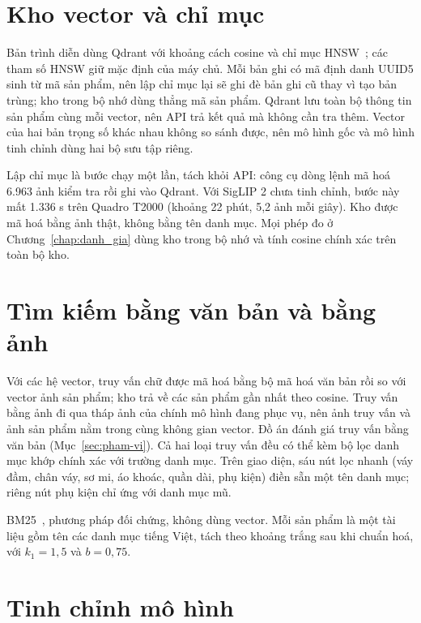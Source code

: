 \section{Kho vector và chỉ mục}
\label{sec:kho-vector}

Bản trình diễn dùng Qdrant với khoảng cách cosine và chỉ mục HNSW~\cite{malkov2020hnsw}; các tham số HNSW giữ mặc định của máy chủ. Mỗi bản ghi có mã định danh UUID5 sinh từ mã sản phẩm, nên lập chỉ mục lại sẽ ghi đè bản ghi cũ thay vì tạo bản trùng; kho trong bộ nhớ dùng thẳng mã sản phẩm. Qdrant lưu toàn bộ thông tin sản phẩm cùng mỗi vector, nên API trả kết quả mà không cần tra thêm. Vector của hai bản trọng số khác nhau không so sánh được, nên mô hình gốc và mô hình tinh chỉnh dùng hai bộ sưu tập riêng.

Lập chỉ mục là bước chạy một lần, tách khỏi API: công cụ dòng lệnh mã hoá 6.963 ảnh kiểm tra rồi ghi vào Qdrant. Với SigLIP 2 chưa tinh chỉnh, bước này mất 1.336 s trên Quadro T2000 (khoảng 22 phút, 5,2 ảnh mỗi giây). Kho được mã hoá bằng ảnh thật, không bằng tên danh mục. Mọi phép đo ở Chương~\ref{chap:danh_gia} dùng kho trong bộ nhớ và tính cosine chính xác trên toàn bộ kho.

\section{Tìm kiếm bằng văn bản và bằng ảnh}
\label{sec:tim-kiem}

Với các hệ vector, truy vấn chữ được mã hoá bằng bộ mã hoá văn bản rồi so với vector ảnh sản phẩm; kho trả về các sản phẩm gần nhất theo cosine. Truy vấn bằng ảnh đi qua tháp ảnh của chính mô hình đang phục vụ, nên ảnh truy vấn và ảnh sản phẩm nằm trong cùng không gian vector. Đồ án đánh giá truy vấn bằng văn bản (Mục~\ref{sec:pham-vi}). Cả hai loại truy vấn đều có thể kèm bộ lọc danh mục khớp chính xác với trường danh mục. Trên giao diện, sáu nút lọc nhanh (váy đầm, chân váy, sơ mi, áo khoác, quần dài, phụ kiện) điền sẵn một tên danh mục; riêng nút phụ kiện chỉ ứng với danh mục mũ.

BM25~\cite{robertson2009bm25}, phương pháp đối chứng, không dùng vector. Mỗi sản phẩm là một tài liệu gồm tên các danh mục tiếng Việt, tách theo khoảng trắng sau khi chuẩn hoá, với $k_1 = 1{,}5$ và $b = 0{,}75$.

\section{Tinh chỉnh mô hình}
\label{sec:tinh-chinh}

